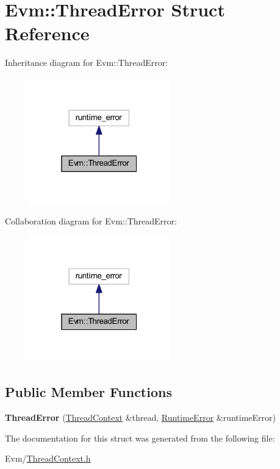 \hypertarget{struct_evm_1_1_thread_error}{}\section{Evm\+:\+:Thread\+Error Struct Reference}
\label{struct_evm_1_1_thread_error}


Inheritance diagram for Evm\+:\+:Thread\+Error\+:
\nopagebreak
\begin{figure}[H]
\begin{center}
\leavevmode
\includegraphics[width=172pt]{struct_evm_1_1_thread_error__inherit__graph}
\end{center}
\end{figure}


Collaboration diagram for Evm\+:\+:Thread\+Error\+:
\nopagebreak
\begin{figure}[H]
\begin{center}
\leavevmode
\includegraphics[width=172pt]{struct_evm_1_1_thread_error__coll__graph}
\end{center}
\end{figure}
\subsection*{Public Member Functions}
\begin{DoxyCompactItemize}
\item 
\mbox{\label{struct_evm_1_1_thread_error_a9f87107a90a44083d4ea187db7539730}} 
{\bfseries Thread\+Error} (\mbox{\hyperlink{struct_evm_1_1_thread_context}{Thread\+Context}} \&thread, \mbox{\hyperlink{struct_evm_1_1_runtime_error}{Runtime\+Error}} \&runtime\+Error)
\end{DoxyCompactItemize}


The documentation for this struct was generated from the following file\+:\begin{DoxyCompactItemize}
\item 
Evm/\mbox{\hyperlink{_thread_context_8h}{Thread\+Context.\+h}}\end{DoxyCompactItemize}
